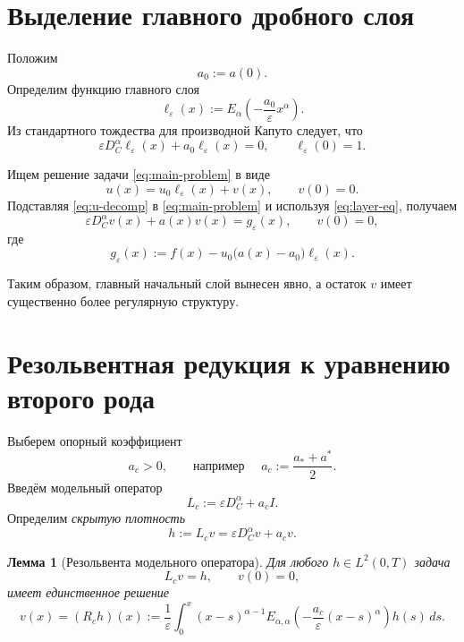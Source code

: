 \documentclass[12pt,a4paper]{article}
\newtheorem{lemma}[theorem]{Лемма}
\theoremstyle{definition}
\newcommand{\eps}{\varepsilon}
\newcommand{\Dc}{D_C^\alpha}
\newcommand{\Lc}{L_c}
\newcommand{\Rc}{R_c}
\begin{document}
\section{Выделение главного дробного слоя}

Положим
\[
a_0:=a(0).
\]
Определим функцию главного слоя
\begin{equation}
\label{eq:layer}
\ell_\eps(x):=E_\alpha\!\left(-\frac{a_0}{\eps}x^\alpha\right).
\end{equation}
Из стандартного тождества для производной Капуто следует, что
\begin{equation}
\label{eq:layer-eq}
\eps \Dc \ell_\eps(x)+a_0\ell_\eps(x)=0,
\qquad \ell_\eps(0)=1.
\end{equation}

Ищем решение задачи \eqref{eq:main-problem} в виде
\begin{equation}
\label{eq:u-decomp}
u(x)=u_0\ell_\eps(x)+v(x),
\qquad v(0)=0.
\end{equation}
Подставляя \eqref{eq:u-decomp} в \eqref{eq:main-problem} и используя \eqref{eq:layer-eq}, получаем
\begin{equation}
\label{eq:v-eq}
\eps \Dc v(x)+a(x)v(x)=g_\eps(x),
\qquad v(0)=0,
\end{equation}
где
\begin{equation}
\label{eq:g-eps}
g_\eps(x):=f(x)-u_0\bigl(a(x)-a_0\bigr)\ell_\eps(x).
\end{equation}

Таким образом, главный начальный слой вынесен явно, а остаток $v$ имеет существенно более
регулярную структуру.

\section{Резольвентная редукция к уравнению второго рода}

Выберем опорный коэффициент
\begin{equation}
\label{eq:ac}
a_c>0,
\qquad \text{например } \quad a_c:=\frac{a_*+a^*}{2}.
\end{equation}
Введём модельный оператор
\begin{equation}
\label{eq:Lc}
\Lc := \eps \Dc + a_c I.
\end{equation}
Определим \emph{скрытую плотность}
\begin{equation}
\label{eq:hidden-density}
h:=\Lc v = \eps \Dc v + a_c v.
\end{equation}

\begin{lemma}[Резольвента модельного оператора]
\label{lem:resolvent}
Для любого $h\in L^2(0,T)$ задача
\[
\Lc v = h, \qquad v(0)=0,
\]
имеет единственное решение
\begin{equation}
\label{eq:resolvent}
v(x)=(\Rc h)(x):=
\frac{1}{\eps}\int_0^x (x-s)^{\alpha-1}
E_{\alpha,\alpha}\!\left(-\frac{a_c}{\eps}(x-s)^\alpha\right)h(s)\,ds.
\end{equation}
\end{lemma}
\end{document}
